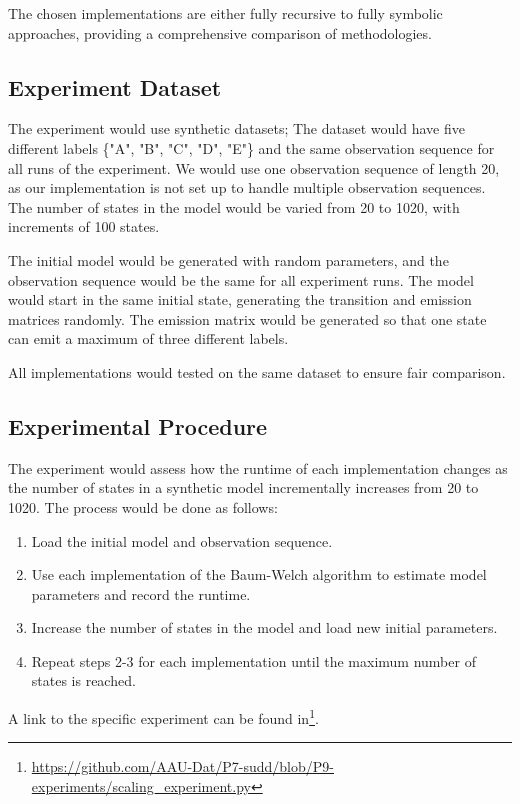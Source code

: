 The chosen implementations are either fully recursive to fully symbolic approaches, providing a comprehensive comparison of methodologies.

\subsection{Experiment Dataset}
The experiment would use synthetic datasets; The dataset would have five different labels \{"A", "B", "C", "D", "E"\} and the same observation sequence for all runs of the experiment. 
We would use one observation sequence of length 20, as our implementation is not set up to handle multiple observation sequences.
The number of states in the model would be varied from 20 to 1020, with increments of 100 states.

The initial model would be generated with random parameters, and the observation sequence would be the same for all experiment runs.
The model would start in the same initial state, generating the transition and emission matrices randomly.
The emission matrix would be generated so that one state can emit a maximum of three different labels.

All implementations would tested on the same dataset to ensure fair comparison.

\subsection{Experimental Procedure}
The experiment would assess how the runtime of each implementation changes as the number of states in a synthetic model incrementally increases from 20 to 1020. 
The process would be done as follows:

\begin{enumerate}
\item Load the initial model and observation sequence.
\item Use each implementation of the Baum-Welch algorithm to estimate model parameters and record the runtime.
\item Increase the number of states in the model and load new initial parameters.
\item Repeat steps 2-3 for each implementation until the maximum number of states is reached.
\end{enumerate}

A link to the specific experiment can be found in\footnote{\url{https://github.com/AAU-Dat/P7-sudd/blob/P9-experiments/scaling_experiment.py}}. 


